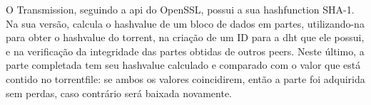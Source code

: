 O Transmission, seguindo a \gls{api} do OpenSSL, possui a sua \gls*{hashfunction}
SHA-1. Na sua versão, calcula o \gls*{hashvalue} de um bloco de dados em partes,
utilizando-na para obter o \gls*{hashvalue} do \gls*{torrent}, na criação de um ID para
a \gls*{dht} que ele possui, e na verificação da integridade das partes obtidas de
outros \glspl*{peer}. Neste último, a parte completada tem seu \gls*{hashvalue}
calculado e comparado com o valor que está contido no \gls*{torrentfile}: se ambos os
valores coincidirem, então a parte foi adquirida sem perdas, caso contrário será baixada
novamente.


